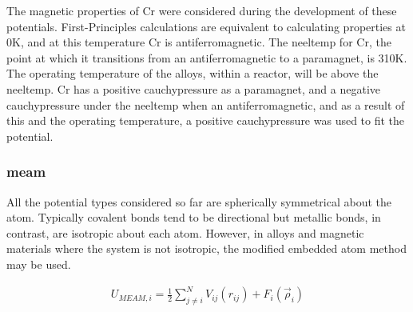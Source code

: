 The magnetic properties of \Gls{Cr} were considered during the development of these potentials.  First-Principles calculations are equivalent to calculating properties at 0K, and at this temperature \Gls{Cr} is \gls{antiferromagnetic}.  The \Gls{neeltemp} for Cr, the point at which it transitions from an antiferromagnetic to a paramagnet, is 310K.  The operating temperature of the alloys, within a reactor, will be above the \Gls{neeltemp}.  \Gls{Cr} has a positive \Gls{cauchypressure} as a paramagnet, and a negative \Gls{cauchypressure} under the \Gls{neeltemp} when an \gls{antiferromagnetic}, and as a result of this and the operating temperature, a positive \Gls{cauchypressure} was used to fit the potential.










\subsubsection{\Acrlong{meam}}
\label{section:meam}

All the potential types considered so far are spherically symmetrical about the atom.  Typically covalent bonds tend to be directional but metallic bonds, in contrast, are isotropic about each atom.  However, in alloys and magnetic materials where the system is not isotropic, the modified embedded atom method may be used.

\begin{equation}
\begin{split}
U_{MEAM, i} = \frac{1}{2} \sum \limits_{j\ne i}^{N} V_{ij}(r_{ij}) + F_i (\vec{\rho}_i) \\
\end{split}
\label{eq:eqMEAM1}
\end{equation}

